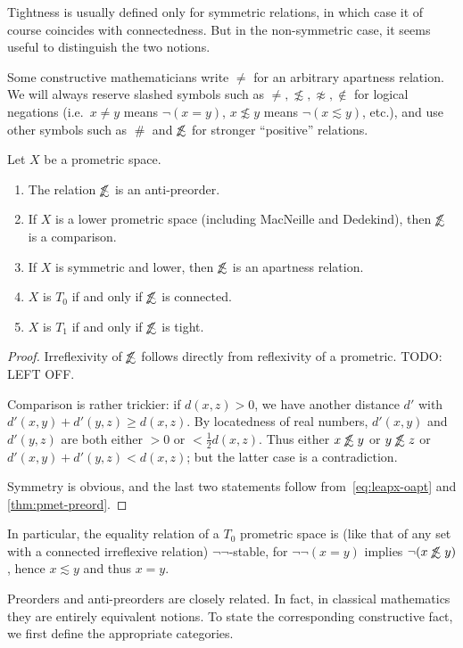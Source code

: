 \documentclass{article}
\def\apart{\mathrel{\#}}
\def\napprox{\not\approx}
\def\oapt{\mathrel{\!\not\,\not\lesssim}}
\def\leapx{\lesssim}
\def\nn{\ensuremath{\neg\neg}}
\begin{document}
Tightness is usually defined only for symmetric relations, in which case it of course coincides with connectedness.
But in the non-symmetric case, it seems useful to distinguish the two notions.

\begin{warn}
  Some constructive mathematicians write $\neq$ for an arbitrary apartness relation.
  We will always reserve slashed symbols such as $\neq,\not\leapx,\napprox,\notin$ for logical negations (i.e.\ $x\neq y$ means $\neg(x=y)$, $x\not\leapx y$ means $\neg(x\leapx y)$, etc.), and use other symbols such as $\apart$ and $\oapt$ for stronger ``positive'' relations.
\end{warn}

\begin{thm}
  Let $X$ be a prometric space.
  \begin{enumerate}
  \item The relation $\oapt$ is an anti-preorder.
  \item If $X$ is a lower prometric space (including MacNeille and Dedekind), then $\oapt$ is a comparison.
  \item If $X$ is symmetric and lower, then $\oapt$ is an apartness relation.
  \item $X$ is $T_0$ if and only if $\oapt$ is connected.
  \item $X$ is $T_1$ if and only if $\oapt$ is tight.
  \end{enumerate}
\end{thm}
\begin{proof}
  Irreflexivity of $\oapt $ follows directly from reflexivity of a prometric.
  TODO: LEFT OFF.

  Comparison is rather trickier: if $d(x,z)>0$, we have another distance $d'$ with $d'(x,y)+d'(y,z)\ge d(x,z)$.
  By locatedness of real numbers, $d'(x,y)$ and $d'(y,z)$ are both either $>0$ or $<\frac12 d(x,z)$.
  Thus either $x\oapt y$ or $y\oapt z$ or $d'(x,y)+d'(y,z) < d(x,z)$; but the latter case is a contradiction.

  Symmetry is obvious, and the last two statements follow from~\eqref{eq:leapx-oapt} and \cref{thm:pmet-preord}.
\end{proof}

In particular, the equality relation of a $T_0$ prometric space is (like that of any set with a connected irreflexive relation) \nn-stable, for $\neg\neg(x=y)$ implies $\neg(x\oapt y)$, hence $x\leapx y$ and thus $x=y$.

Preorders and anti-preorders are closely related.
In fact, in classical mathematics they are entirely equivalent notions.
To state the corresponding constructive fact, we first define the appropriate categories.
\end{document}
